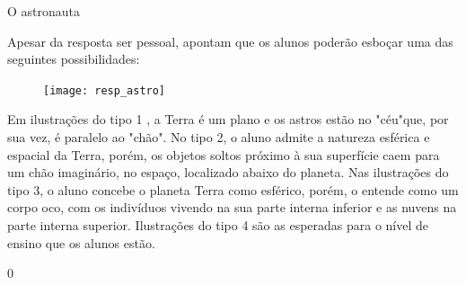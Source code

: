 \begin{answer}{O astronauta}
{Apesar da resposta ser pessoal, \cite{Nardi} apontam que  os alunos poderão esboçar  uma das seguintes possibilidades: 
  
 \begin{figure}[H]
	\centering
		\texttt{[image: resp\_astro]}
	\end{figure}
	
Em ilustrações do tipo 1 , a Terra é um plano e os astros estão no "céu"{}que, por sua vez, é paralelo ao "chão". 
No tipo 2, o aluno admite a natureza esférica e espacial da Terra, porém, os objetos soltos próximo à sua superfície caem  para um chão imaginário, no espaço, localizado abaixo do planeta. Nas ilustrações do tipo 3, o aluno concebe o planeta Terra como esférico, porém, o entende como um corpo oco, com os indivíduos vivendo na sua parte interna inferior e as nuvens na parte interna superior. Ilustrações do tipo 4 são as esperadas para o nível de ensino que os alunos estão. }{0}
\end{answer}





